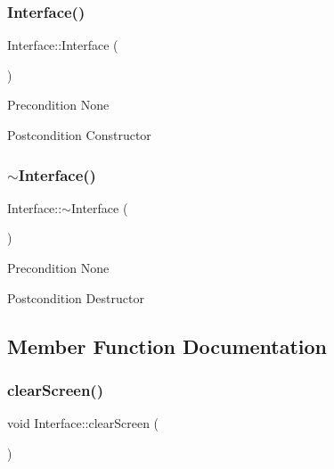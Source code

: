 \subsubsection{\texorpdfstring{Interface()}{Interface()}}
{\footnotesize\ttfamily Interface\+::\+Interface (\begin{DoxyParamCaption}{ }\end{DoxyParamCaption})}

\begin{DoxyPrecond}{Precondition}
None 
\end{DoxyPrecond}
\begin{DoxyPostcond}{Postcondition}
Constructor 
\end{DoxyPostcond}
\mbox{\label{class_interface_a19179888f29f18f1be54a3dfe98f68c0}} 
\subsubsection{\texorpdfstring{$\sim$\+Interface()}{~Interface()}}
{\footnotesize\ttfamily Interface\+::$\sim$\+Interface (\begin{DoxyParamCaption}{ }\end{DoxyParamCaption})}

\begin{DoxyPrecond}{Precondition}
None 
\end{DoxyPrecond}
\begin{DoxyPostcond}{Postcondition}
Destructor 
\end{DoxyPostcond}


\subsection{Member Function Documentation}
\mbox{\label{class_interface_af92bb2aeecc6a19095af23fa78b49451}} 
\subsubsection{\texorpdfstring{clear\+Screen()}{clearScreen()}}
{\footnotesize\ttfamily void Interface\+::clear\+Screen (\begin{DoxyParamCaption}{ }\end{DoxyParamCaption})\hspace{0.3cm}{\ttfamily [static]}}

